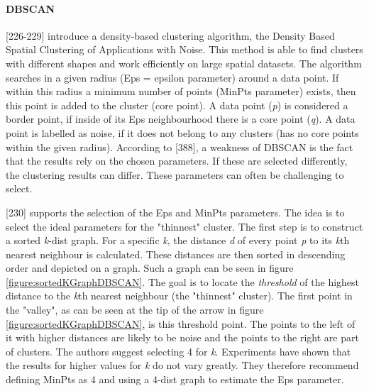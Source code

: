 \paragraph{DBSCAN}
\label{section:DBSCAN}
\textcite{DBSCAN}[226-229] introduce a density-based clustering algorithm, the Density Based Spatial Clustering of Applications with Noise. This method is able to find clusters with different shapes and work efficiently on large spatial datasets. The algorithm searches in a given radius (Eps = epsilon parameter) around a data point. If within this radius a minimum number of points (MinPts parameter) exists, then this point is added to the cluster (core point). A data point (\textit{p}) is considered a border point, if inside of its Eps neighbourhood there is a core point (\textit{q}). A data point is labelled as noise, if it does not belong to any clusters (has no core points within the given radius).
According to \textcite{han2011data}[388], a weakness of DBSCAN is the fact that the results rely on the chosen parameters. If these are selected differently, the clustering results can differ. These parameters can often be challenging to select.

\textcite{DBSCAN}[230] supports the selection of the Eps and MinPts parameters. The idea is to select the ideal parameters for the "thinnest" cluster. The first step is to construct a sorted \textit{k}-dist graph. For a specific \textit{k}, the distance \textit{d} of every point \textit{p} to its \textit{k}th nearest neighbour is calculated. These distances are then sorted in descending order and depicted on a graph. Such a graph can be seen in figure \ref{figure:sortedKGraphDBSCAN}. The goal is to locate the \textit{threshold} of the highest distance to the \textit{k}th nearest neighbour (the "thinnest" cluster). The first point in the "valley", as can be seen at the tip of the arrow in figure \ref{figure:sortedKGraphDBSCAN}, is this threshold point. The points to the left of it with higher distances are likely to be noise and the points to the right are part of clusters. The authors suggest selecting 4 for \textit{k}. Experiments have shown that the results for higher values for \textit{k} do not vary greatly. They therefore recommend defining MinPts as 4 and using a 4-dist graph to estimate the Eps parameter.


